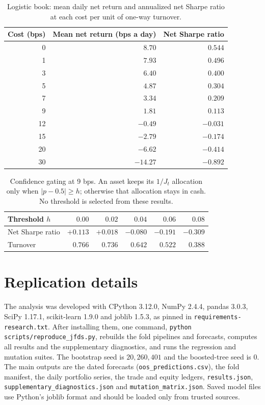 \documentclass[preprint,12pt,authoryear,a4paper]{elsarticle}
\begin{document}
\begin{table}[H]\centering\small
\caption{Logistic book: mean daily net return and annualized net Sharpe ratio at
each cost per unit of one-way turnover.}
\label{tab:costcurve}
\begin{tabular}{@{}rrr@{}}
\toprule
Cost (bps) & Mean net return (bps a day) & Net Sharpe ratio \\
\midrule
0  & $8.70$   & $0.544$  \\
1  & $7.93$   & $0.496$  \\
3  & $6.40$   & $0.400$  \\
5  & $4.87$   & $0.304$  \\
7  & $3.34$   & $0.209$  \\
9  & $1.81$   & $0.113$  \\
12 & $-0.49$  & $-0.031$ \\
15 & $-2.79$  & $-0.174$ \\
20 & $-6.62$  & $-0.414$ \\
30 & $-14.27$ & $-0.892$ \\
\bottomrule
\end{tabular}
\end{table}

\begin{table}[H]\centering\small
\caption{Confidence gating at 9 bps. An asset keeps its $1/J_t$ allocation only when
$|p-0.5|\ge h$; otherwise that allocation stays in cash. No threshold is selected
from these results.}
\label{tab:gates}
\begin{tabular}{@{}lrrrrr@{}}
\toprule
Threshold $h$ & $0.00$ & $0.02$ & $0.04$ & $0.06$ & $0.08$ \\
\midrule
Net Sharpe ratio & $+0.113$ & $+0.018$ & $-0.080$ & $-0.191$ & $-0.309$ \\
Turnover         & $0.766$ & $0.736$ & $0.642$ & $0.522$ & $0.388$ \\
\bottomrule
\end{tabular}
\end{table}

\section{Replication details}\label{app:replication}

The analysis was developed with CPython 3.12.0, NumPy 2.4.4, pandas 3.0.3, SciPy
1.17.1, scikit-learn 1.9.0 and joblib 1.5.3, as pinned in
\texttt{requirements-research.txt}. After installing them, one command,
\texttt{python scripts/reproduce\_jfds.py}, rebuilds the fold pipelines and
forecasts, computes all results and the supplementary diagnostics, and runs the
regression and mutation suites. The bootstrap seed is $20{,}260{,}401$ and the
boosted-tree seed is 0. The main outputs are the dated forecasts
(\texttt{oos\_predictions.csv}), the fold manifest, the daily portfolio series, the
trade and equity ledgers, \texttt{results.json},
\texttt{supplementary\_diagnostics.json} and \texttt{mutation\_matrix.json}. Saved
model files use Python's joblib format and should be loaded only from trusted
sources.
\end{document}
